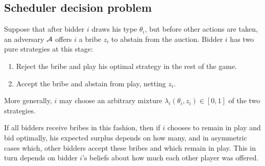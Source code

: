\begin{comment}
\end{example}

\begin{example}[Censorship by congestion]
  
  Suppose a censoring adversary can perform only the actions assumed of the `honest' users of our blockchain system: creating transaction items and offering payment in exchange for their inclusion.
  Such an adversary may attempt a \emph{spam attack}, creating junk transactions with sufficiently high fee bids that, during the attack, no fee-maximising block contains the targeted items.
  Do we need to take into consideration attacks of this form in computing censorship resistance?
  
  I will argue that a blockspace supply mechanism subject to a successful attack of this form is essentially functioning as intended.
  The optimal allocation of blockspace to items with sufficient payments is an economically efficient outcome, regardless of the intent behind the creation of those items.
  I'll use this argument to justify not attempting to compute the costs of such an attack, \emph{even if it might be cheaper} than other approaches (though the reader may find this rather unlikely, we can construct examples in which it would be).
  
\end{example}
\end{comment}




\subsection{Scheduler decision problem}

Suppose that after bidder $i$ draws his type $\theta_i$, but before other actions are taken, an adversary $\mathcal{A}$ offers $i$ a bribe $z_i$ to abstain from the auction.
%
Bidder $i$ has two pure strategies at this stage:
\begin{enumerate}
  \item Reject the bribe and play his optimal strategy in the rest of the game.
  \item Accept the bribe and abstain from play, netting $z_i$.
\end{enumerate}
%
More generally, $i$ may choose an arbitrary mixture $\lambda_i(\theta_i,z_i)\in[0,1]$ of the two strategies.

If all bidders receive bribes in this fashion, then if $i$ chooses to remain in play and bid optimally, his expected surplus depends on how many, and in asymmetric cases which, other bidders accept these bribes and which remain in play.
%
This in turn depends on bidder $i$'s beliefs about how much each other player was offered.

